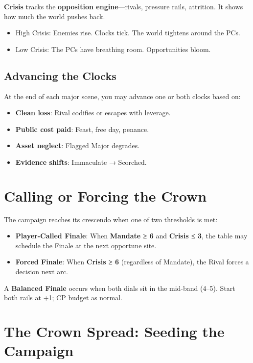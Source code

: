 \textbf{Crisis} tracks the \textbf{opposition engine}---rivals, pressure rails, attrition. It shows how much the world pushes back.

\begin{itemize}
    \item High Crisis: Enemies rise. Clocks tick. The world tightens around the PCs.
    \item Low Crisis: The PCs have breathing room. Opportunities bloom.
\end{itemize}

\subsection*{Advancing the Clocks}

At the end of each major scene, you may advance one or both clocks based on:

\begin{itemize}
    \item \textbf{Clean loss}: Rival codifies or escapes with leverage.
    \item \textbf{Public cost paid}: Feast, free day, penance.
    \item \textbf{Asset neglect}: Flagged Major degrades.
    \item \textbf{Evidence shifts}: Immaculate → Scorched.
\end{itemize}

\section*{Calling or Forcing the Crown}

The campaign reaches its crescendo when one of two thresholds is met:

\begin{itemize}
    \item \textbf{Player-Called Finale}: When \textbf{Mandate ≥ 6} and \textbf{Crisis ≤ 3}, the table may schedule the Finale at the next opportune site.
    \item \textbf{Forced Finale}: When \textbf{Crisis ≥ 6} (regardless of Mandate), the Rival forces a decision next arc.
\end{itemize}

A \textbf{Balanced Finale} occurs when both dials sit in the mid-band (4--5). Start both rails at +1; CP budget as normal.

\section*{The Crown Spread: Seeding the Campaign}

